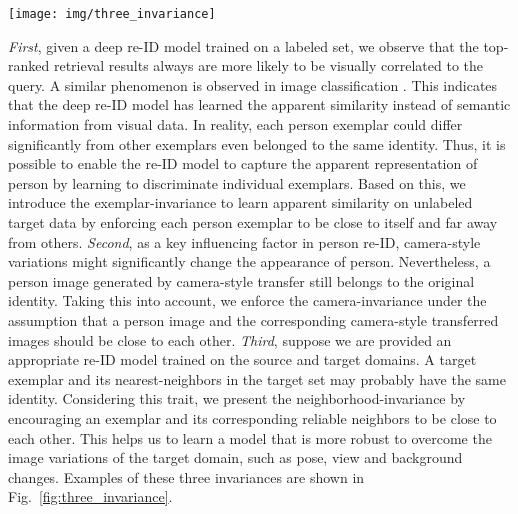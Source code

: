 \documentclass[10pt,twocolumn,letterpaper]{article}
\begin{document}
\begin{figure*}[!t]
    \centering
    \texttt{[image: img/three\_invariance]}
    \caption{Examples of three underlying invariances. (a) Exemplar-invariance: an exemplar is enforced to be apart from others. (b) Camera-invariance: an exemplar and its camera-style transferred (CamStyle) images are encouraged to be close to each other, as well as CamStyle images should be far away from others. (c) Neighborhood-invariance: an exemplar and its neighbors are forced to be close to each other.}
    \label{fig:three_invariance}
\end{figure*}



\emph{First}, given a deep re-ID model trained on a labeled set, we observe that the top-ranked retrieval results always are more likely to be visually correlated to the query. 
A similar phenomenon is observed in image classification \cite{wu2018unsupervised}. 
This indicates that the deep re-ID model has learned the apparent similarity instead of semantic information from visual data. 
In reality, each person exemplar could differ significantly from other exemplars even belonged to the same identity. 
Thus, it is possible to enable the re-ID model to capture the apparent representation of person by learning to discriminate individual exemplars.
Based on this, we introduce the exemplar-invariance to learn apparent similarity on unlabeled target data by enforcing each person exemplar to be close to itself and far away from others. 
\emph{Second}, as a key influencing factor in person re-ID, camera-style variations \cite{zhong2018camera} might significantly change the appearance of person. Nevertheless, a person image generated by camera-style transfer still belongs to the original identity. Taking this into account, we enforce the camera-invariance \cite{Zhong_2018_ECCV} under the assumption that a person image and the corresponding camera-style transferred images should be close to each other.
\emph{Third}, suppose we are provided an appropriate re-ID model trained on the source and target domains. A target exemplar and its nearest-neighbors in the target set may probably have the same identity.  
Considering this trait, we present the neighborhood-invariance by encouraging an exemplar and its corresponding reliable neighbors to be close to each other. This helps us to learn a model that is more robust to overcome the image variations of the target domain, such as pose, view and background changes. Examples of these three invariances are shown in Fig.~\ref{fig:three_invariance}.
\end{document}
